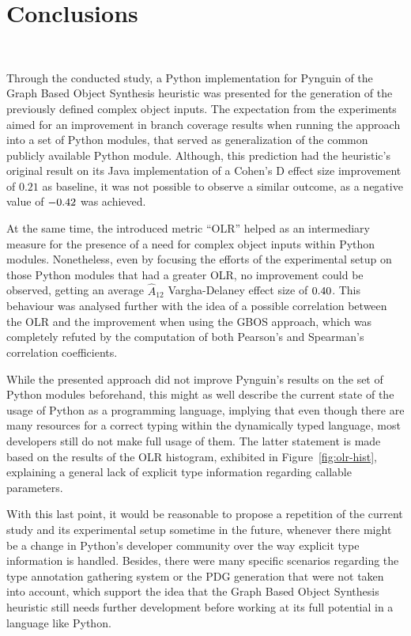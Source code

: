 \documentclass[%
  chapterprefix=false,%
  open=right,%
  twoside=true,%
  paper=a4,%
  logofile={Figures/logo.png},%
  thesistype=master,%
  UKenglish,%
]{se2thesis}
\begin{document}
\chapter{Conclusions}~\label{chap:conclusions}

Through the conducted study, a Python implementation for Pynguin of the Graph Based Object Synthesis heuristic was presented for the generation of the previously defined complex object inputs.
The expectation from the experiments aimed for an improvement in branch coverage results when running the approach into a set of Python modules, that served as generalization of the common publicly available Python module.
Although, this prediction had the heuristic's original result on its Java implementation of a Cohen's D effect size improvement of \(0.21\) as baseline, it was not possible to observe a similar outcome, as a negative value of \(-0.42\) was achieved.

At the same time, the introduced metric ``OLR'' helped as an intermediary measure for the presence of a need for complex object inputs within Python modules. 
Nonetheless, even by focusing the efforts of the experimental setup on those Python modules that had a greater OLR, no improvement could be observed, getting an average \(\hat{A}_{12}\) Vargha-Delaney effect size of \(0.40\).
This behaviour was analysed further with the idea of a possible correlation between the OLR and the improvement when using the GBOS approach, which was completely refuted by the computation of both Pearson's and Spearman's correlation coefficients.

While the presented approach did not improve Pynguin's results on the set of Python modules beforehand, this might as well describe the current state of the usage of Python as a programming language, implying that even though there are many resources for a correct typing within the dynamically typed language, most developers still do not make full usage of them.
The latter statement is made based on the results of the OLR histogram, exhibited in Figure~\ref{fig:olr-hist}, explaining a general lack of explicit type information regarding callable parameters.

With this last point, it would be reasonable to propose a repetition of the current study and its experimental setup sometime in the future, whenever there might be a change in Python's developer community over the way explicit type information is handled.
Besides, there were many specific scenarios regarding the type annotation gathering system or the PDG generation that were not taken into account, which support the idea that the Graph Based Object Synthesis heuristic still needs further development before working at its full potential in a language like Python.
\end{document}
